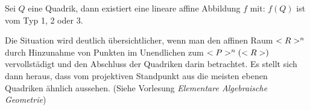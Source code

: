 \begin{conclusion}
	Sei $Q$ eine Quadrik, dann existiert eine lineare affine Abbildung $f$ mit: $f(Q)$ ist vom Typ 1, 2 oder 3.
\end{conclusion}

\begin{remark}
	Die Situation wird deutlich übersichtlicher, wenn man den affinen Raum $<R>^n$ durch Hinzunahme von Punkten im Unendlichen zum  $<P>^n(<R>)$ vervollstädigt und den Abschluss der Quadriken darin betrachtet. Es stellt sich dann heraus, dass vom projektiven Standpunkt aus die meisten ebenen Quadriken ähnlich aussehen. (Siehe Vorlesung \textit{Elementare Algebraische Geometrie})
\end{remark}
